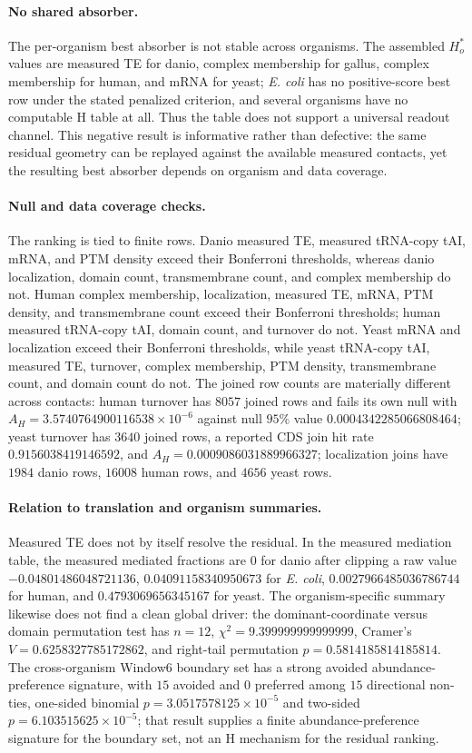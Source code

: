 \paragraph{No shared absorber.}
The per-organism best absorber is not stable across organisms.  The assembled $H_o^\ast$ values are measured TE for danio, complex membership for gallus, complex membership for human, and mRNA for yeast; \emph{E. coli} has no positive-score best row under the stated penalized criterion, and several organisms have no computable H table at all.  Thus the table does not support a universal readout channel.  This negative result is informative rather than defective: the same residual geometry can be replayed against the available measured contacts, yet the resulting best absorber depends on organism and data coverage.

\paragraph{Null and data coverage checks.}
The ranking is tied to finite rows.  Danio measured TE, measured tRNA-copy tAI, mRNA, and PTM density exceed their Bonferroni thresholds, whereas danio localization, domain count, transmembrane count, and complex membership do not.  Human complex membership, localization, measured TE, mRNA, PTM density, and transmembrane count exceed their Bonferroni thresholds; human measured tRNA-copy tAI, domain count, and turnover do not.  Yeast mRNA and localization exceed their Bonferroni thresholds, while yeast tRNA-copy tAI, measured TE, turnover, complex membership, PTM density, transmembrane count, and domain count do not.  The joined row counts are materially different across contacts: human turnover has $8057$ joined rows and fails its own null with $A_H=3.5740764900116538\times 10^{-6}$ against null $95\%$ value $0.0004342285066808464$; yeast turnover has $3640$ joined rows, a reported CDS join hit rate $0.9156038419146592$, and $A_H=0.0009086031889966327$; localization joins have $1984$ danio rows, $16008$ human rows, and $4656$ yeast rows.

\paragraph{Relation to translation and organism summaries.}
Measured TE does not by itself resolve the residual.  In the measured mediation table, the measured mediated fractions are $0$ for danio after clipping a raw value $-0.04801486048721136$, $0.04091158340950673$ for \emph{E. coli}, $0.0027966485036786744$ for human, and $0.4793069656345167$ for yeast.  The organism-specific summary likewise does not find a clean global driver: the dominant-coordinate versus domain permutation test has $n=12$, $\chi^2=9.399999999999999$, Cramer's $V=0.6258327785172862$, and right-tail permutation $p=0.5814185814185814$.  The cross-organism Window6 boundary set has a strong avoided abundance-preference signature, with $15$ avoided and $0$ preferred among $15$ directional non-ties, one-sided binomial $p=3.0517578125\times 10^{-5}$ and two-sided $p=6.103515625\times 10^{-5}$; that result supplies a finite abundance-preference signature for the boundary set, not an H mechanism for the residual ranking.

